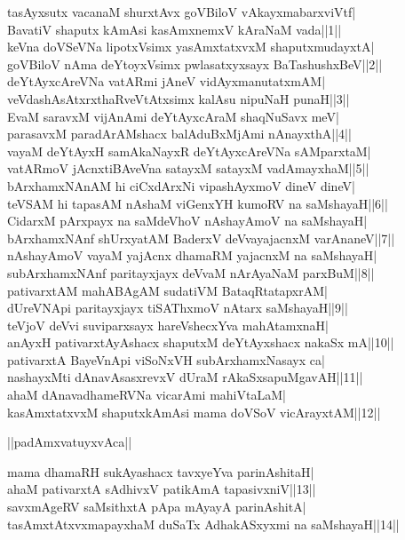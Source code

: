 \documentclass{article}
\begin{document}
tasAyxsutx vacanaM shurxtAvx goVBiloV vAkayxmabarxviVtf|\\
BavatiV shaputx kAmAsi kasAmxnemxV kAraNaM vada||1||\\
keVna doVSeVNa lipotxVsimx yasAmxtatxvxM shaputxmudayxtA|\\
goVBiloV nAma deYtoyxVsimx pwlasatxyxsayx BaTashushxBeV||2||\\
deYtAyxcAreVNa vatARmi jAneV vidAyxmanutatxmAM|\\
veVdashAsAtxrxthaRveVtAtxsimx kalAsu nipuNaH punaH||3||\\
EvaM saravxM vijAnAmi deYtAyxcAraM shaqNuSavx meV|\\
parasavxM paradArAMshacx balAduBxMjAmi nAnayxthA||4||\\
vayaM deYtAyxH samAkaNayxR deYtAyxcAreVNa sAMparxtaM|\\
vatARmoV jAcnxtiBAveVna satayxM satayxM vadAmayxhaM||5||\\
bArxhamxNAnAM hi ciCxdArxNi vipashAyxmoV dineV dineV|\\
teVSAM hi tapasAM nAshaM viGenxYH kumoRV na saMshayaH||6||\\
CidarxM pArxpayx na saMdeVhoV nAshayAmoV na saMshayaH|\\
bArxhamxNAnf shUrxyatAM BaderxV deVvayajacnxM varAnaneV||7||\\
nAshayAmoV vayaM yajAcnx dhamaRM yajacnxM na saMshayaH|\\
subArxhamxNAnf paritayxjayx deVvaM nArAyaNaM parxBuM||8||\\
pativarxtAM mahABAgAM sudatiVM BataqRtatapxrAM|\\
dUreVNApi paritayxjayx tiSAThxmoV nAtarx saMshayaH||9||\\
teVjoV deVvi suviparxsayx hareVshecxYva mahAtamxnaH|\\
anAyxH pativarxtAyAshacx shaputxM deYtAyxshacx nakaSx mA||10||\\
pativarxtA BayeVnApi viSoNxVH subArxhamxNasayx ca|\\
nashayxMti dAnavAsasxrevxV dUraM rAkaSxsapuMgavAH||11||\\
ahaM dAnavadhameRVNa vicarAmi mahiVtaLaM|\\
kasAmxtatxvxM shaputxkAmAsi mama doVSoV vicArayxtAM||12||\\

\begin{center}
||padAmxvatuyxvAca||
\end{center}

mama dhamaRH sukAyashacx tavxyeYva parinAshitaH|\\
ahaM pativarxtA sAdhivxV patikAmA tapasivxniV||13||\\
savxmAgeRV saMsithxtA pApa mAyayA parinAshitA|\\
tasAmxtAtxvxmapayxhaM duSaTx AdhakASxyxmi na saMshayaH||14||\\
\end{document}
